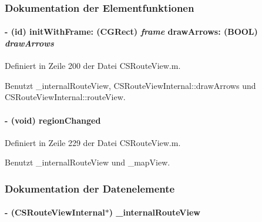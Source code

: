 \subsubsection{Dokumentation der Elementfunktionen}
\hypertarget{interface_c_s_route_view_a12dc74e4cd6d4c33fa16abcf6c06e768}{
\paragraph[{initWithFrame:drawArrows:}]{\setlength{\rightskip}{0pt plus 5cm}-\/ (id) initWithFrame: (CGRect) {\em frame}\/ drawArrows: (BOOL) {\em drawArrows}}\hfill}
\label{interface_c_s_route_view_a12dc74e4cd6d4c33fa16abcf6c06e768}


Definiert in Zeile 200 der Datei CSRouteView.m.

Benutzt \_\-internalRouteView, CSRouteViewInternal::drawArrows und CSRouteViewInternal::routeView.\hypertarget{interface_c_s_route_view_a32f44e359ed911edd65611b02ae32208}{
\paragraph[{regionChanged}]{\setlength{\rightskip}{0pt plus 5cm}-\/ (void) regionChanged }\hfill}
\label{interface_c_s_route_view_a32f44e359ed911edd65611b02ae32208}


Definiert in Zeile 229 der Datei CSRouteView.m.

Benutzt \_\-internalRouteView und \_\-mapView.

\subsubsection{Dokumentation der Datenelemente}
\hypertarget{interface_c_s_route_view_a92cd1128c9f172fff59f1eb3e4c674cf}{
\paragraph[{\_\-internalRouteView}]{\setlength{\rightskip}{0pt plus 5cm}-\/ ({\bf CSRouteViewInternal}$\ast$) {\bf \_\-internalRouteView}}\hfill}
\label{interface_c_s_route_view_a92cd1128c9f172fff59f1eb3e4c674cf}



